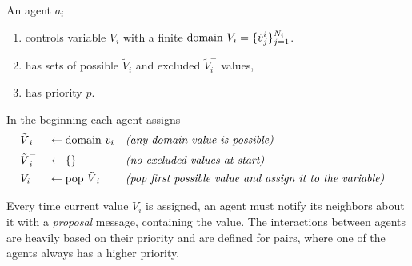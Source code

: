 \documentclass[../ThesisDoc]{subfiles}
\begin{document}
\noindent
An agent $a_i$
\begin{enumerate}
  \item controls variable $V_i$ with a finite $\mathrm{domain}~V_i =
        \{{\dot v}^i_j\}_{j=1}^{N_i}$.
  \item has sets of possible ${\tilde V}_i$ and excluded ${\tilde V}_i^-$ values,
  \item has priority $p$.
\end{enumerate}

\noindent
In the beginning each agent assigns
\begin{align*}
  &{\tilde V}_i   &&\leftarrow \mathrm{domain}~v_i       && \textit{(any domain value is possible)} & \\
  &{\tilde V}_i^- &&\leftarrow \{\}              && \textit{(no excluded values at start)}  &\\
  &V_i            &&\leftarrow \mathrm{pop}~{\tilde V}_i && \textit{(pop first possible value and assign it to the variable)} &\\
\end{align*}

Every time current value $V_i$ is assigned, an agent must notify its
neighbors about it with a \emph{proposal} message, containing the value.
The interactions between agents are heavily based on their priority and are
defined for pairs, where one of the agents always has a higher priority.
\end{document}
